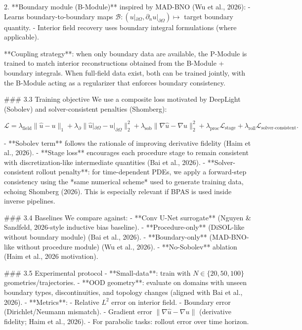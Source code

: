 2. **Boundary module (B-Module)** inspired by MAD-BNO (Wu et al., 2026):
   - Learns boundary-to-boundary maps \( \mathcal{B}: (u|_{\partial\Omega}, \partial_n u|_{\partial\Omega}) \mapsto \) target boundary quantity.
   - Interior field recovery uses boundary integral formulations (where applicable).

**Coupling strategy**: when only boundary data are available, the P-Module is trained to match interior reconstructions obtained from the B-Module + boundary integrals. When full-field data exist, both can be trained jointly, with the B-Module acting as a regularizer that enforces boundary consistency.

### 3.3 Training objective
We use a composite loss motivated by DeepLight (Sobolev) and solver-consistent penalties (Shomberg):

\[
\mathcal{L} = \lambda_{\text{field}}\| \hat{u}-u\|_1
+ \lambda_{\partial}\|\hat{u}|_{\partial\Omega}-u|_{\partial\Omega}\|_2^2
+ \lambda_{\text{sob}}\|\nabla \hat{u}-\nabla u\|_2^2
+ \lambda_{\text{proc}}\mathcal{L}_{\text{stage}}
+ \lambda_{\text{roll}}\mathcal{L}_{\text{solver-consistent}}.
\]

- **Sobolev term** follows the rationale of improving derivative fidelity (Haim et al., 2026).
- **Stage loss** encourages each procedure stage to remain consistent with discretization-like intermediate quantities (Bai et al., 2026).
- **Solver-consistent rollout penalty**: for time-dependent PDEs, we apply a forward-step consistency using the *same numerical scheme* used to generate training data, echoing Shomberg (2026). This is especially relevant if BPAS is used inside inverse pipelines.

### 3.4 Baselines
We compare against:
- **Conv U-Net surrogate** (Nguyen & Sandfeld, 2026-style inductive bias baseline).
- **Procedure-only** (DiSOL-like without boundary module) (Bai et al., 2026).
- **Boundary-only** (MAD-BNO-like without procedure module) (Wu et al., 2026).
- **No-Sobolev** ablation (Haim et al., 2026 motivation).

### 3.5 Experimental protocol
- **Small-data**: train with \(N \in \{20, 50, 100\}\) geometries/trajectories.
- **OOD geometry**: evaluate on domains with unseen boundary types, discontinuities, and topology changes (aligned with Bai et al., 2026).
- **Metrics**:
  - Relative \(L^2\) error on interior field.
  - Boundary error (Dirichlet/Neumann mismatch).
  - Gradient error \( \|\nabla \hat{u}-\nabla u\| \) (derivative fidelity; Haim et al., 2026).
  - For parabolic tasks: rollout error over time horizon.

